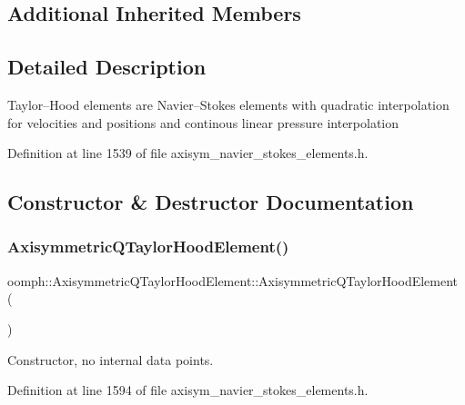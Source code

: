 \subsection*{Additional Inherited Members}


\subsection{Detailed Description}
Taylor--Hood elements are Navier--Stokes elements with quadratic interpolation for velocities and positions and continous linear pressure interpolation 

Definition at line 1539 of file axisym\+\_\+navier\+\_\+stokes\+\_\+elements.\+h.



\subsection{Constructor \& Destructor Documentation}
\mbox{\label{classoomph_1_1AxisymmetricQTaylorHoodElement_ac6b80d9619833e670b80cafff35f3739}} 
\subsubsection{\texorpdfstring{Axisymmetric\+Q\+Taylor\+Hood\+Element()}{AxisymmetricQTaylorHoodElement()}}
{\footnotesize\ttfamily oomph\+::\+Axisymmetric\+Q\+Taylor\+Hood\+Element\+::\+Axisymmetric\+Q\+Taylor\+Hood\+Element (\begin{DoxyParamCaption}{ }\end{DoxyParamCaption})\hspace{0.3cm}{\ttfamily [inline]}}



Constructor, no internal data points. 



Definition at line 1594 of file axisym\+\_\+navier\+\_\+stokes\+\_\+elements.\+h.



